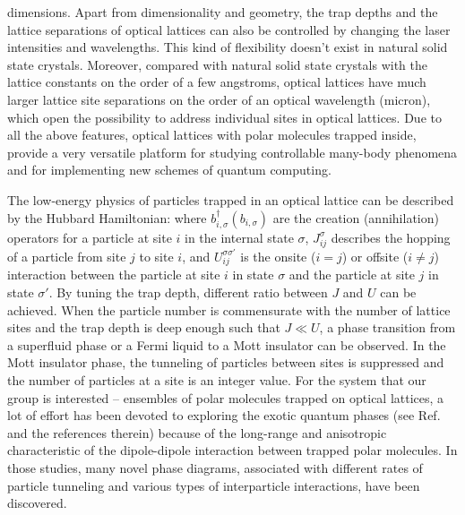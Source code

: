 dimensions. Apart from dimensionality and geometry, the trap depths and the lattice separations of optical lattices can also be controlled
by changing the laser intensities and wavelengths. This kind of flexibility doesn't exist in natural solid state crystals. 
Moreover, compared with natural solid state crystals with the lattice constants on the order of a few angstroms, optical lattices have much larger lattice site separations on the order of an optical wavelength (micron), which open the possibility to address individual sites in optical lattices\cite{atom-mott1, atom-mott2}. 
Due to all the above features, optical lattices with polar molecules trapped inside, provide a very versatile platform for studying controllable many-body 
  phenomena\cite{Baranov2012} and for implementing new schemes of quantum computing\cite{demille, yelin2006, ortner2011}. 
  
The low-energy physics of particles trapped in an optical lattice can be described by the Hubbard Hamiltonian:
where $b^{\dagger}_{i, \sigma} (b_{i, \sigma})$ are the creation (annihilation) operators for a particle at site $i$ in the
internal state $\sigma$, $J_{ij}^{\sigma}$ describes the hopping of a particle from site $j$ to site $i$, and $U_{i j}^{\sigma \sigma'}$ is the onsite ($i=j$) or offsite ($i\neq j$) interaction between the particle at site $i$ in state $\sigma$ and the particle at site $j$ in state $\sigma'$. By tuning the trap depth, different ratio between $J$ and $U$ can
be achieved. When  the particle number is commensurate with the 
number of lattice sites and the trap depth is deep enough such that $J \ll U$, a phase transition from a superfluid phase
or a  Fermi liquid to a Mott insulator can be 
observed\cite{Greiner2002, spielman2007, haller2010, joerdens2008, schneider2008}. In the Mott insulator phase, the tunneling of particles between sites
is suppressed and the number of particles at a site is an integer value. For the system that our group is interested -- ensembles of 
polar molecules trapped on optical lattices, a lot of effort has been devoted to exploring the exotic quantum phases (see Ref.\cite{Baranov2012} and the references therein) because of the long-range and anisotropic characteristic of the 
dipole-dipole interaction between trapped polar molecules.  
In those studies, many novel phase diagrams, associated with different rates of particle tunneling and various types of 
interparticle interactions, have been discovered.

